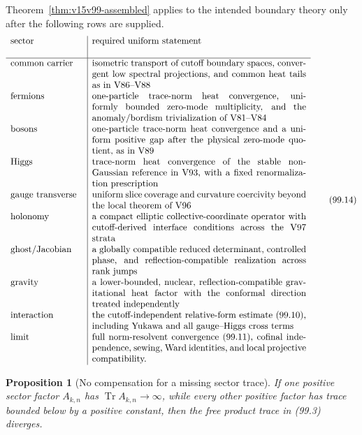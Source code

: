 \documentclass[11pt]{article}
\newtheorem{proposition}[theorem]{Proposition}
\theoremstyle{remark}
\begin{document}
Theorem~\ref{thm:v15v99-assembled} applies to the intended boundary
theory only after the following rows are supplied.
\[
\begin{array}{p{0.23\textwidth}|p{0.68\textwidth}}
\hbox{sector}&\hbox{required uniform statement}\\ \hline
\hbox{common carrier}&
isometric transport of cutoff boundary spaces, convergent low
spectral projections, and common heat tails as in V86--V88\\
\hbox{fermions}&
one-particle trace-norm heat convergence, uniformly bounded
zero-mode multiplicity, and the anomaly/bordism trivialization of
V81--V84\\
\hbox{bosons}&
one-particle trace-norm heat convergence and a uniform positive
gap after the physical zero-mode quotient, as in V89\\
\hbox{Higgs}&
trace-norm heat convergence of the stable non-Gaussian reference
in V93, with a fixed renormalization prescription\\
\hbox{gauge transverse}&
uniform slice coverage and curvature coercivity beyond the local
theorem of V96\\
\hbox{holonomy}&
a compact elliptic collective-coordinate operator with
cutoff-derived interface conditions across the V97 strata\\
\hbox{ghost/Jacobian}&
a globally compatible reduced determinant, controlled phase, and
reflection-compatible realization across rank jumps\\
\hbox{gravity}&
a lower-bounded, nuclear, reflection-compatible gravitational heat
factor with the conformal direction treated independently\\
\hbox{interaction}&
the cutoff-independent relative-form estimate (99.10), including
Yukawa and all gauge--Higgs cross terms\\
\hbox{limit}&
full norm-resolvent convergence (99.11), cofinal independence,
sewing, Ward identities, and local projective compatibility.
\end{array}                                            \tag{99.14}
\]

\begin{proposition}[No compensation for a missing sector trace]
\label{prop:v15v99-no-compensation}
If one positive sector factor \(A_{k,n}\) has
\(\operatorname{Tr}A_{k,n}\to\infty\), while every other positive
factor has trace bounded below by a positive constant, then the
free product trace in (99.3) diverges.
\end{proposition}
\end{document}

